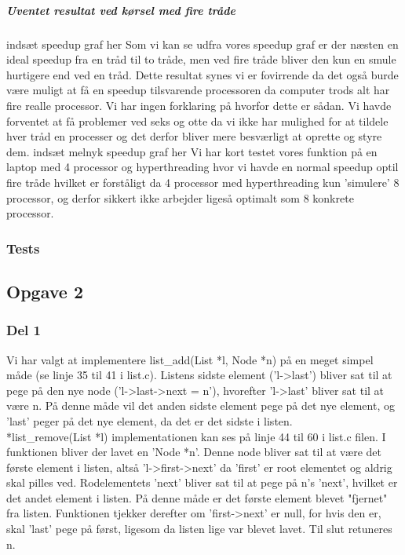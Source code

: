 \subparagraph{Uventet resultat ved kørsel med fire tråde}
indsæt speedup graf her \n\n
Som vi kan se udfra vores speedup graf er der næsten en ideal speedup fra en tråd til to tråde, men ved fire tråde bliver den kun en smule hurtigere end ved en tråd. Dette resultat synes vi er fovirrende da det også burde være muligt at få en speedup tilsvarende processoren da computer trods alt har fire realle processor. Vi har ingen forklaring på hvorfor dette er sådan. 
Vi havde forventet at få problemer ved seks og otte da vi ikke har mulighed for at tildele hver tråd en processer og det derfor bliver mere besværligt at oprette og styre dem. 
indsæt melnyk speedup graf her \n\n
Vi har kort testet vores funktion på en laptop med 4 processor og hyperthreading hvor vi havde en normal speedup optil fire tråde hvilket er forståligt da 4 processor med hyperthreading kun 'simulere' 8 processor, og derfor sikkert ikke arbejder ligeså optimalt som 8 konkrete processor.

\subsubsection{Tests}
\label{O1_Tests}


\subsection{Opgave 2}
\label{O2}

\subsubsection{Del 1}
\label{O2_1}
Vi har valgt at implementere list_add(List *l, Node *n) på en meget simpel måde (se linje 35 til 41 i list.c). Listens sidste element ('l->last') bliver sat til at pege på den nye node ('l->last->next = n'), hvorefter 'l->last' bliver sat til at være n. På denne måde vil det anden sidste element pege på det nye element, og 'last' peger på det nye element, da det er det sidste i listen.
\\*list_remove(List *l) implementationen kan ses på linje 44 til 60 i list.c filen. I funktionen bliver der lavet en 'Node *n'. Denne node bliver sat til at være det første element i listen, altså 'l->first->next' da 'first' er root elementet og aldrig skal pilles ved. Rodelementets 'next' bliver sat til at pege på n's 'next', hvilket er det andet element i listen. På denne måde er det første element blevet "fjernet" fra listen. Funktionen tjekker derefter om 'first->next' er null, for hvis den er, skal 'last' pege på først, ligesom da listen lige var blevet lavet. Til slut retuneres n.

